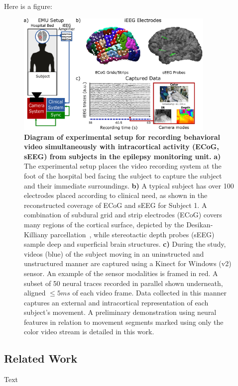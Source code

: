 Here is a figure:
\begin{figure}[!ht]
\centering
\includegraphics[width=0.85\textwidth]{img/method_setup.pdf}
\caption[This is the short form of the caption. It has to be no more than 4 lines.]{\textbf{Diagram of experimental setup for recording behavioral video simultaneously with intracortical activity (ECoG, sEEG) from subjects in the epilepsy monitoring unit.} \textbf{a)} The experimental setup places the video recording system at the foot of the hospital bed facing the subject to capture the subject and their immediate surroundings. \textbf{b)} A typical subject has over 100 electrodes placed according to clinical need, as shown in the reconstructed coverage of ECoG and sEEG for Subject 1. A combination of subdural grid and strip electrodes (ECoG) covers many regions of the cortical surface, depicted by the Desikan-Killiany parcellation~\cite{desikan2006automated}, while stereotactic depth probes (sEEG) sample deep and superficial brain structures. \textbf{c)} During the study, videos (blue) of the subject moving in an uninstructed and unstructured manner are captured using a Kinect for Windows (v2) sensor. An example of the sensor modalities is framed in red. A subset of 50 neural traces recorded in parallel shown underneath, aligned $\leq 5ms$ of each video frame. Data collected in this manner captures an external and intracortical representation of each subject's movement. A preliminary demonstration using neural features in relation to movement segments marked using only the color video stream is detailed in this work.}
\label{fig-setup}
\end{figure}

\subsection{Related Work} 
Text

